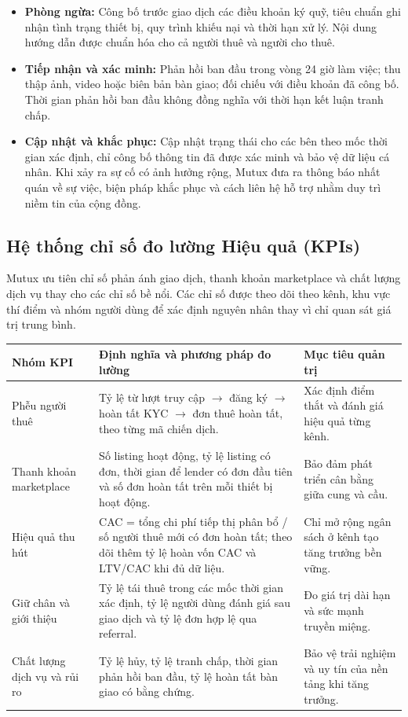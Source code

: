 \begin{itemize}
    \item \textbf{Phòng ngừa:} Công bố trước giao dịch các điều khoản ký quỹ, tiêu chuẩn ghi nhận tình trạng thiết bị, quy trình khiếu nại và thời hạn xử lý. Nội dung hướng dẫn được chuẩn hóa cho cả người thuê và người cho thuê.
    \item \textbf{Tiếp nhận và xác minh:} Phản hồi ban đầu trong vòng 24 giờ làm việc; thu thập ảnh, video hoặc biên bản bàn giao; đối chiếu với điều khoản đã công bố. Thời gian phản hồi ban đầu không đồng nghĩa với thời hạn kết luận tranh chấp.
    \item \textbf{Cập nhật và khắc phục:} Cập nhật trạng thái cho các bên theo mốc thời gian xác định, chỉ công bố thông tin đã được xác minh và bảo vệ dữ liệu cá nhân. Khi xảy ra sự cố có ảnh hưởng rộng, Mutux đưa ra thông báo nhất quán về sự việc, biện pháp khắc phục và cách liên hệ hỗ trợ nhằm duy trì niềm tin của cộng đồng.
\end{itemize}

\subsection{Hệ thống chỉ số đo lường Hiệu quả (KPIs)}

Mutux ưu tiên chỉ số phản ánh giao dịch, thanh khoản marketplace và chất lượng dịch vụ thay cho các chỉ số bề nổi. Các chỉ số được theo dõi theo kênh, khu vực thí điểm và nhóm người dùng để xác định nguyên nhân thay vì chỉ quan sát giá trị trung bình.

\begin{longtable}{@{}p{}p{}p{}@{}}
\toprule
\textbf{Nhóm KPI} & \textbf{Định nghĩa và phương pháp đo lường} & \textbf{Mục tiêu quản trị} \\
\midrule
\endhead
Phễu người thuê & Tỷ lệ từ lượt truy cập $\rightarrow$ đăng ký $\rightarrow$ hoàn tất KYC $\rightarrow$ đơn thuê hoàn tất, theo từng mã chiến dịch. & Xác định điểm thắt và đánh giá hiệu quả từng kênh. \\
Thanh khoản marketplace & Số listing hoạt động, tỷ lệ listing có đơn, thời gian để lender có đơn đầu tiên và số đơn hoàn tất trên mỗi thiết bị hoạt động. & Bảo đảm phát triển cân bằng giữa cung và cầu. \\
Hiệu quả thu hút & CAC = tổng chi phí tiếp thị phân bổ / số người thuê mới có đơn hoàn tất; theo dõi thêm tỷ lệ hoàn vốn CAC và LTV/CAC khi đủ dữ liệu. & Chỉ mở rộng ngân sách ở kênh tạo tăng trưởng bền vững. \\
Giữ chân và giới thiệu & Tỷ lệ tái thuê trong các mốc thời gian xác định, tỷ lệ người dùng đánh giá sau giao dịch và tỷ lệ đơn hợp lệ qua referral. & Đo giá trị dài hạn và sức mạnh truyền miệng. \\
Chất lượng dịch vụ và rủi ro & Tỷ lệ hủy, tỷ lệ tranh chấp, thời gian phản hồi ban đầu, tỷ lệ hoàn tất bàn giao có bằng chứng. & Bảo vệ trải nghiệm và uy tín của nền tảng khi tăng trưởng. \\
\bottomrule
\end{longtable}


